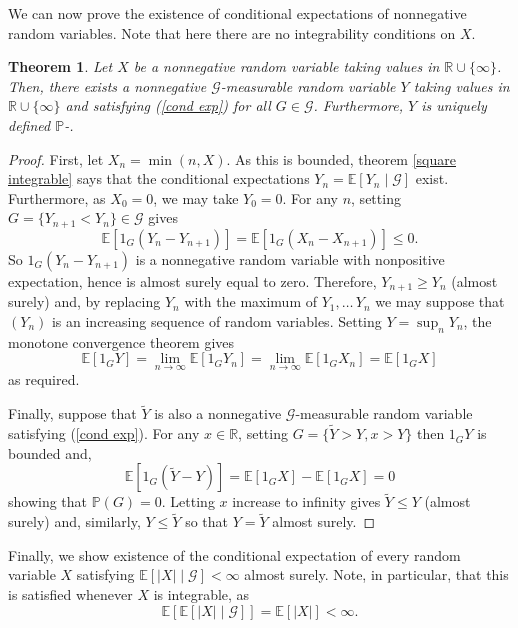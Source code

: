 \documentclass[12pt]{article}
\newtheorem{theorem}{Theorem}
\begin{document}
We can now prove the existence of conditional expectations of nonnegative random variables. Note that here there are no integrability conditions on $X$.

\begin{theorem}\label{nonnegative}
Let $X$ be a nonnegative random variable taking values in $\mathbb{R}\cup\{\infty\}$. Then, there exists a nonnegative $\mathcal{G}$-measurable random variable $Y$ taking values in $\mathbb{R}\cup\{\infty\}$ and satisfying (\ref{cond exp}) for all $G\in\mathcal{G}$. Furthermore, $Y$ is uniquely defined $\mathbb{P}$-.
\end{theorem}
\begin{proof}
First, let $X_n=\min(n,X)$. As this is bounded, theorem \ref{square integrable} says that the conditional expectations $Y_n=\mathbb{E}[Y_n\mid\mathcal{G}]$ exist. Furthermore, as $X_0=0$, we may take $Y_0=0$.
For any $n$, setting $G=\{Y_{n+1}<Y_n\}\in\mathcal{G}$ gives
\begin{equation*}
\mathbb{E}[1_G(Y_n-Y_{n+1})]=\mathbb{E}[1_G(X_n-X_{n+1})]\le 0.
\end{equation*}
So $1_G(Y_n-Y_{n+1})$ is a nonnegative random variable with nonpositive expectation, hence is almost surely equal to zero. Therefore, $Y_{n+1}\ge Y_n$ (almost surely) and, by replacing $Y_n$ with the maximum of $Y_1,\ldots\,Y_n$ we may suppose that $(Y_n)$ is an increasing sequence of random variables. Setting $Y=\sup_nY_n$, the monotone convergence theorem gives
\begin{equation*}
\mathbb{E}[1_GY]=\lim_{n\rightarrow\infty}\mathbb{E}[1_GY_n]=\lim_{n\rightarrow\infty}\mathbb{E}[1_GX_n]=\mathbb{E}[1_GX]
\end{equation*}
as required.

Finally, suppose that $\tilde Y$ is also a nonnegative $\mathcal{G}$-measurable random variable satisfying (\ref{cond exp}). For any $x\in\mathbb{R}$, setting $G=\{\tilde Y>Y,x>Y\}$ then $1_GY$ is bounded and,
\begin{equation*}
\mathbb{E}[1_G(\tilde Y-Y)]=\mathbb{E}[1_GX]-\mathbb{E}[1_GX]=0
\end{equation*}
showing that $\mathbb{P}(G)=0$. Letting $x$ increase to infinity gives $\tilde Y\le Y$ (almost surely) and, similarly, $Y\le \tilde Y$ so that $Y=\tilde Y$ almost surely.
\end{proof}

Finally, we show existence of the conditional expectation of every random variable $X$ satisfying $\mathbb{E}[|X|\mid\mathcal{G}]<\infty$ almost surely. Note, in particular, that this is satisfied whenever $X$ is integrable, as
\begin{equation*}
\mathbb{E}[\mathbb{E}[|X|\mid\mathcal{G}]]=\mathbb{E}[|X|]<\infty.
\end{equation*}
\end{document}

